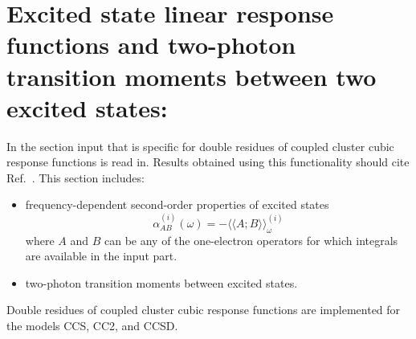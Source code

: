 
\section{Excited state linear response functions and
         two-photon transition moments between two excited states:
         }
\label{sec:ccexlr}

In the  section input that is specific for 
double residues of coupled cluster cubic response functions 
is read in.
Results obtained using this functionality should cite
Ref.~\cite{Haettig:EXCITED,Haettig:EXLR}. 
This section includes:
\begin{itemize}
\item frequency-dependent second-order properties of excited states
      $$ \alpha^{(i)}_{AB}(\omega) = 
         -\langle\langle A; B\rangle\rangle^{(i)}_\omega $$
      where $A$ and $B$ can be any of the one-electron operators
      for which integrals  are available in the 
      input part.
\item two-photon transition moments between excited states.
\end{itemize}
Double residues of coupled cluster cubic response functions are
implemented for the models CCS, CC2, and CCSD.

\begin{center}
\end{center}


